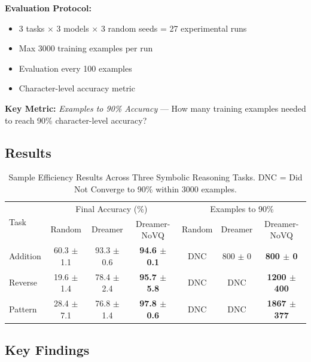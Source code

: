 \documentclass[11pt,twocolumn]{article}
\begin{document}
\textbf{Evaluation Protocol:}
\begin{itemize}
    \item 3 tasks $\times$ 3 models $\times$ 3 random seeds = 27 experimental runs
    \item Max 3000 training examples per run
    \item Evaluation every 100 examples
    \item Character-level accuracy metric
\end{itemize}

\textbf{Key Metric:} \textit{Examples to 90\% Accuracy} --- How many training examples needed to reach 90\% character-level accuracy?

\subsection{Results}

\begin{table}[t]
\centering
\caption{Sample Efficiency Results Across Three Symbolic Reasoning Tasks. DNC = Did Not Converge to 90\% within 3000 examples.}
\label{tab:results}
\begin{tabular}{l|ccc|ccc}
\toprule
\multirow{2}{*}{Task} & \multicolumn{3}{c|}{Final Accuracy (\%)} & \multicolumn{3}{c}{Examples to 90\%} \\
& Random & Dreamer & Dreamer-NoVQ & Random & Dreamer & Dreamer-NoVQ \\
\midrule
Addition & 60.3 $\pm$ 1.1 & 93.3 $\pm$ 0.6 & \textbf{94.6 $\pm$ 0.1} & DNC & 800 $\pm$ 0 & \textbf{800 $\pm$ 0} \\
Reverse & 19.6 $\pm$ 1.4 & 78.4 $\pm$ 2.4 & \textbf{95.7 $\pm$ 5.8} & DNC & DNC & \textbf{1200 $\pm$ 400} \\
Pattern & 28.4 $\pm$ 7.1 & 76.8 $\pm$ 1.4 & \textbf{97.8 $\pm$ 0.6} & DNC & DNC & \textbf{1867 $\pm$ 377} \\
\bottomrule
\end{tabular}
\end{table}

\subsection{Key Findings}
\end{document}
